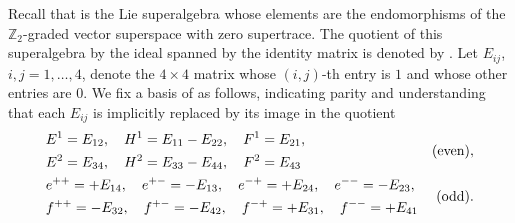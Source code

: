 \documentclass[pdftex]{sigma}
\numberwithin{equation}{section}
\newcommand{\fld}[1]{\mathbb{#1}} %
\newcommand{\alg}[1]{\mathfrak{#1}} %
\newcommand{\ZZ}{\fld{Z}}
\newcommand{\CC}{\fld{C}}
\newcommand{\SLSA}[3]{\alg{#1}_{#2 \vert #3}} %
\newcommand{\psl}{\SLSA{psl}{2}{2}}
\begin{document}
Recall that \smash{$\SLSA{sl}{2}{2}$} is the Lie superalgebra whose elements are the endomorphisms of the $\ZZ_2$-graded vector superspace \smash{$\CC^{2\vert2}$} with zero supertrace.
The quotient of this superalgebra by the ideal spanned by the identity matrix is denoted by \smash{$\psl$}.
Let $E_{ij}$, $i,j=1,\dots,4$, denote the $4\times4$ matrix whose $(i,j)$-th entry is $1$ and whose other entries are $0$.
We fix a basis of \smash{$\psl$} as follows, indicating parity and understanding that each $E_{ij}$ is implicitly replaced by its image in the quotient%
\begin{equation}\label{eq:pslbasis}
	\begin{aligned}
	&	\begin{split}
			& E^1 = E_{12}, \quad H^1 = E_{11}-E_{22}, \quad F^1 = E_{21}, \\
			& E^2= E_{34}, \quad H^2 = E_{33}-E_{44}, \quad F^2 = E_{43}
		\end{split}
		& {\rm (even)}, \\
		& \begin{split}
		&	e^{++} = +E_{14}, \quad e^{+-} = -E_{13}, \quad e^{-+} = +E_{24}, \quad e^{--} = -E_{23}, \\
		&	f^{++} = -E_{32}, \quad f^{+-} = -E_{42}, \quad f^{-+} = +E_{31}, \quad f^{--} = +E_{41}
		\end{split}
		& {\rm (odd)}.
	\end{aligned}
\end{equation}
\end{document}
